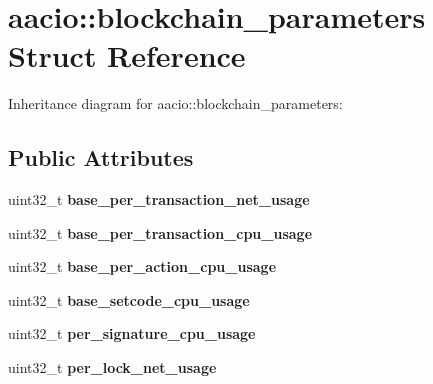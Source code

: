 \hypertarget{structaacio_1_1blockchain__parameters}{}\section{aacio\+:\+:blockchain\+\_\+parameters Struct Reference}
\label{structaacio_1_1blockchain__parameters}


Inheritance diagram for aacio\+:\+:blockchain\+\_\+parameters\+:
\subsection*{Public Attributes}
\begin{DoxyCompactItemize}
\item 
\mbox{\label{structaacio_1_1blockchain__parameters_a5386000387adf89e3d0e013b05bb054a}} 
uint32\+\_\+t {\bfseries base\+\_\+per\+\_\+transaction\+\_\+net\+\_\+usage}
\item 
\mbox{\label{structaacio_1_1blockchain__parameters_afb829b922d4f1aa2b84db08b14321de2}} 
uint32\+\_\+t {\bfseries base\+\_\+per\+\_\+transaction\+\_\+cpu\+\_\+usage}
\item 
\mbox{\label{structaacio_1_1blockchain__parameters_a1aec9268b588d5c71c9adb3b4c9ce537}} 
uint32\+\_\+t {\bfseries base\+\_\+per\+\_\+action\+\_\+cpu\+\_\+usage}
\item 
\mbox{\label{structaacio_1_1blockchain__parameters_a6d2f6687c7dafcfeeed93a45a08ab10c}} 
uint32\+\_\+t {\bfseries base\+\_\+setcode\+\_\+cpu\+\_\+usage}
\item 
\mbox{\label{structaacio_1_1blockchain__parameters_af7d6ade072e3065db3e513b1c5575b8e}} 
uint32\+\_\+t {\bfseries per\+\_\+signature\+\_\+cpu\+\_\+usage}
\item 
\mbox{\label{structaacio_1_1blockchain__parameters_af5895a166459d2f7919d330446487ce0}} 
uint32\+\_\+t {\bfseries per\+\_\+lock\+\_\+net\+\_\+usage}
\item 
\mbox{\label{structaacio_1_1blockchain__parameters_a0ab6affac35ba0d05ea21b4c20b96373}} 

\end{DoxyCompactItemize}
